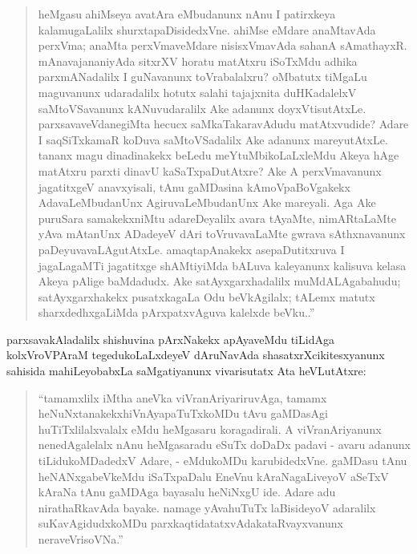 \begin{quote}
heMgasu ahiMseya avatAra eMbudanunx nAnu I patirxkeya kalamugaLalilx shurxta\-paDisidedxVne. ahiMse eMdare anaMtavAda perxVma; anaMta perxVmaveMdare nisisxVmavAda sahanA sAmathayxR. mAnavajananiyAda sitxrXV horatu matAtxru iSoTxMdu adhika parxmANadalilx I guNavanunx toVrabalalxru? oMbatutx tiMgaLu maguvanunx udaradalilx hotutx salahi tajajxnita duHKadalelxV saMtoVSavanunx kANuvudaralilx Ake adanunx doyxVtisutAtxLe. parxsavaveVdanegiMta hecucx saMkaTakaravAdudu matAtxvudide? Adare I saqSiTxkamaR koDuva saMtoVSadalilx Ake adanunx mareyutAtxLe. tananx magu dinadinakekx beLedu meYtuMbikoLaLxleMdu Akeya hAge matAtxru parxti dinavU kaSaTxpaDutAtxre? Ake A perxVmavanunx jagatitxgeV anavxyisali, tAnu gaMDasina kAmoVpaBoVgakekx AdavaLeMbudanUnx AgiruvaLeMbudanUnx Ake mareyali. Aga Ake puruSara samakekxniMtu adareDeyalilx avara tAyaMte, nimARtaLaMte yAva mAtanUnx ADadeyeV dAri toVruvavaLaMte gwrava sAthxnavanunx paDeyuvavaLAgutAtxLe. amaqtapAnakekx asepaDutitxruva I jagaLagaMTi jagatitxge shAMtiyiMda bALuva kaleyanunx kalisuva kelasa Akeya pAlige baMdadudx. Ake satAyxgarxhadalilx  muMdALAgabahudu; satAyxgarxhakekx pusatxkagaLa Odu beVkAgilalx; tALemx matutx sharxdedhxgaLiMda pArxpatxvAguva kalelxde beVku..''
\end{quote}

parxsavakAladalilx shishuvina pArxNakekx apAyaveMdu tiLidAga kolxVroVPAraM tegedu\-koLaLxdeyeV dAruNavAda shasatxrXcikitesxyanunx sahisida mahiLeyobabxLa saMgatiyanunx vivarisutatx Ata heVLutAtxre:
\begin{quote}
``tamamxlilx iMtha aneVka viVranAriyariruvAga, tamamx heNuNxtanakekx\break hiVnAyapaTuTxkoMDu tAvu gaMDasAgi huTiTxlilalxvalalx eMdu heMga\-saru koragadirali. A viVranAriyanunx nenedAgalelalx nAnu heMgasaradu eSuTx doDaDx padavi - avaru adanunx tiLidukoMDadedxV Adare, - eMdukoMDu karubidedxVne. gaMDasu tAnu heNANxgabeVkeMdu iSaTx\-paDalu EneVnu kAraNagaLiveyoV aSeTxV kAraNa tAnu gaMDAga baya\-salu heNiNxgU ide. Adare adu nirathaRkavAda bayake. namage yAva\break huTuTx laBisideyoV adaralilx suKavAgidudxkoMDu parxkaqtidatatxvAda\break kataRvayxvanunx neraveVrisoVNa.''
\end{quote}

